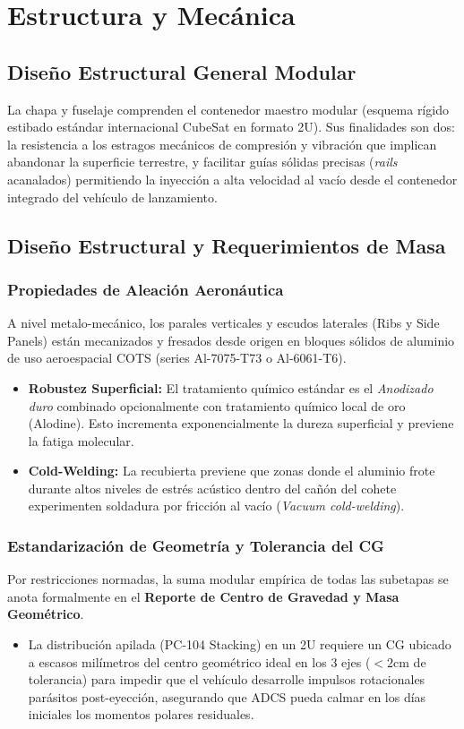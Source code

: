 \chapter{Estructura y Mecánica}

\section{Diseño Estructural General Modular}
La chapa y fuselaje comprenden el contenedor maestro modular (esquema rígido estibado estándar internacional CubeSat en formato 2U). Sus finalidades son dos: la resistencia a los estragos mecánicos de compresión y vibración que implican abandonar la superficie terrestre, y facilitar guías sólidas precisas (\textit{rails} acanalados) permitiendo la inyección a alta velocidad al vacío desde el contenedor integrado del vehículo de lanzamiento.

\section{Diseño Estructural y Requerimientos de Masa}
\subsection{Propiedades de Aleación Aeronáutica}
A nivel metalo-mecánico, los parales verticales y escudos laterales (Ribs y Side Panels) están mecanizados y fresados desde origen en bloques sólidos de aluminio de uso aeroespacial COTS (series Al-7075-T73 o Al-6061-T6). 
\begin{itemize}
    \item \textbf{Robustez Superficial:} El tratamiento químico estándar es el \textit{Anodizado duro} combinado opcionalmente con tratamiento químico local de oro (Alodine). Esto incrementa exponencialmente la dureza superficial y previene la fatiga molecular.
    \item \textbf{Cold-Welding:} La recubierta previene que zonas donde el aluminio frote durante altos niveles de estrés acústico dentro del cañón del cohete experimenten soldadura por fricción al vacío (\textit{Vacuum cold-welding}).
\end{itemize}

\subsection{Estandarización de Geometría y Tolerancia del CG}
Por restricciones normadas, la suma modular empírica de todas las subetapas se anota formalmente en el \textbf{Reporte de Centro de Gravedad y Masa Geométrico}. 
\begin{itemize}
    \item La distribución apilada (PC-104 Stacking) en un 2U requiere un CG ubicado a escasos milímetros del centro geométrico ideal en los 3 ejes ($<2\text{cm}$ de tolerancia) para impedir que el vehículo desarrolle impulsos rotacionales parásitos post-eyección, asegurando que ADCS pueda calmar en los días iniciales los momentos polares residuales.
\end{itemize}

